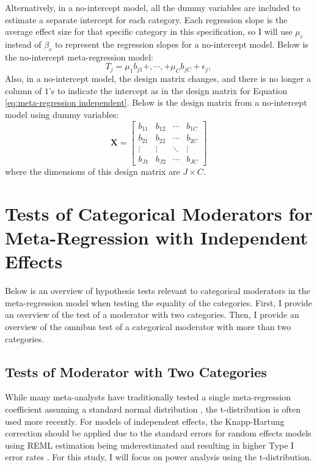 Alternatively, in a no-intercept model, all the dummy variables are included to estimate a separate intercept for each category. Each regression slope is the average effect size for that specific category in this specification, so I will use $\mu_c$ instead of $\beta_c$ to represent the regression slopes for a no-intercept model. Below is the no-intercept meta-regression model: 
\begin{equation}\label{eq: no-intercept independent}
    T_j =  \mu_1  b_{j1} +, \cdots, +   \mu_{C} b_{jC} + \epsilon_j,
\end{equation}
Also, in a no-intercept model, the design matrix changes, and there is no longer a column of $1$'s to indicate the intercept as in the design matrix for Equation \ref{eq:meta-regression independent}. Below is the design matrix from a no-intercept model using dummy variables: 
\begin{equation} \mathbf{X} = 
    \begin{bmatrix}
     b_{11} & b_{12} &\cdots  & b_{1C} \\
     b_{21} & b_{22} & \cdots & b_{2C}\\
     \vdots & \vdots & \ddots & \vdots\\
     b_{J1} & b_{J2} & \cdots & b_{JC}
    \end{bmatrix}
    \nonumber
\end{equation}
where the dimensions of this design matrix are $J \times C$.


\section{Tests of Categorical Moderators for Meta-Regression with Independent Effects}

Below is an overview of hypothesis tests relevant to categorical moderators in the meta-regression model when testing the equality of the categories. First, I provide an overview of the test of a moderator with two categories. Then, I provide an overview of the omnibus test of a categorical moderator with more than two categories.


\subsection{Tests of Moderator with Two Categories}
While many meta-analysts have traditionally tested a single meta-regression coefficient assuming a standard normal distribution \autocite{hedges2004}, the t-distribution is often used more recently. For models of independent effects, the Knapp-Hartung correction should be applied due to the standard errors for random effects models using REML estimation being underestimated and resulting in higher Type I error rates \autocite[see][for details]{cooper2019, knapp2003}. For this study, I will focus on power analysis using the t-distribution.


